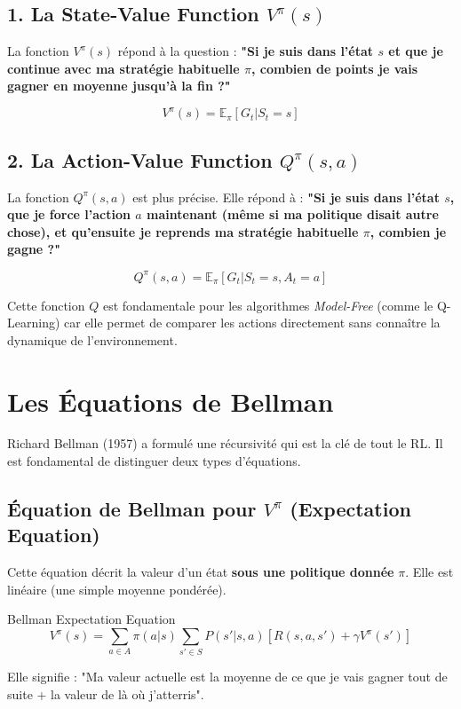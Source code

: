 \documentclass[a4paper,12pt]{report}
\begin{document}
\subsection{1. La State-Value Function $V^\pi(s)$}
La fonction $V^\pi(s)$ répond à la question : \textbf{"Si je suis dans l'état $s$ et que je continue avec ma stratégie habituelle $\pi$, combien de points je vais gagner en moyenne jusqu'à la fin ?"}

\[ V^\pi(s) = \mathbb{E}_{\pi} [G_t | S_t = s] \]

\subsection{2. La Action-Value Function $Q^\pi(s,a)$}
La fonction $Q^\pi(s,a)$ est plus précise. Elle répond à : \textbf{"Si je suis dans l'état $s$, que je force l'action $a$ maintenant (même si ma politique disait autre chose), et qu'ensuite je reprends ma stratégie habituelle $\pi$, combien je gagne ?"}

\[ Q^\pi(s,a) = \mathbb{E}_{\pi} [G_t | S_t = s, A_t = a] \]

Cette fonction $Q$ est fondamentale pour les algorithmes \textit{Model-Free} (comme le Q-Learning) car elle permet de comparer les actions directement sans connaître la dynamique de l'environnement.

\section{Les Équations de Bellman}
Richard Bellman (1957) a formulé une récursivité qui est la clé de tout le RL. Il est fondamental de distinguer deux types d'équations.

\subsection{Équation de Bellman pour $V^\pi$ (Expectation Equation)}
Cette équation décrit la valeur d'un état \textbf{sous une politique donnée} $\pi$. Elle est linéaire (une simple moyenne pondérée).
\begin{mathdef}{Bellman Expectation Equation}
\[ V^\pi(s) = \sum_{a \in A} \pi(a|s) \sum_{s' \in S} P(s'|s,a) \left[ R(s,a,s') + \gamma V^\pi(s') \right] \]
\end{mathdef}
Elle signifie : "Ma valeur actuelle est la moyenne de ce que je vais gagner tout de suite + la valeur de là où j'atterris".
\end{document}
